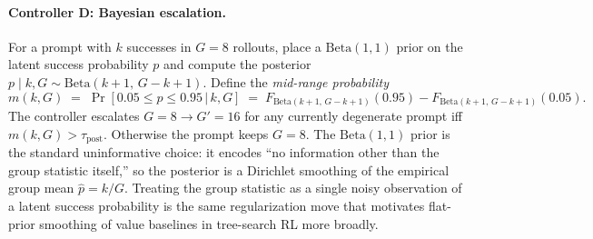 \documentclass{article}
\begin{document}
\paragraph{Controller D: Bayesian escalation.}
For a prompt with $k$ successes in $G{=}8$ rollouts, place a
$\mathrm{Beta}(1,1)$ prior on the latent success probability $p$ and
compute the posterior
$p \mid k, G \sim \mathrm{Beta}(k{+}1,\, G{-}k{+}1)$. Define the
\emph{mid-range probability}
\begin{equation}
m(k, G) \;=\; \Pr\!\left[0.05 \le p \le 0.95 \,\big|\, k, G\right]
\;=\; F_{\mathrm{Beta}(k+1,\, G-k+1)}(0.95) - F_{\mathrm{Beta}(k+1,\, G-k+1)}(0.05).
\label{eq:zvf-midrange}
\end{equation}
The controller escalates $G{=}8 \to G'{=}16$ for any currently
degenerate prompt iff $m(k, G) > \tau_{\mathrm{post}}$. Otherwise the
prompt keeps $G{=}8$. The $\mathrm{Beta}(1,1)$ prior is the standard
uninformative choice: it encodes ``no information other than the
group statistic itself,'' so the posterior is a Dirichlet smoothing
of the empirical group mean $\hat p = k/G$. Treating the group
statistic as a single noisy observation of a latent success
probability is the same regularization move that motivates flat-prior
smoothing of value baselines in tree-search RL more broadly.
\end{document}
